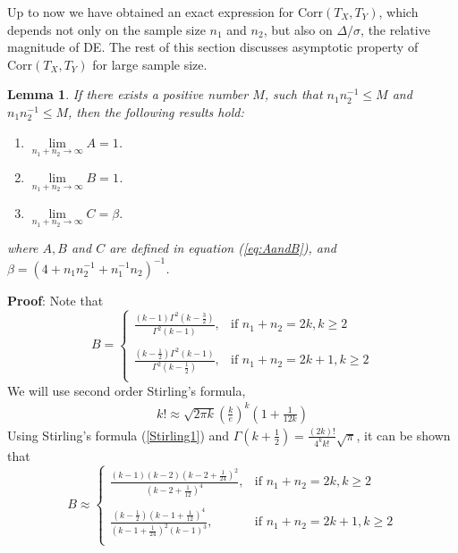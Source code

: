 \documentclass[12pt, a4paper]{article}
\newtheorem{lemma}{Lemma}
\newcommand{\cor}{\text{Corr}}
\begin{document}
	Up to now we have obtained an exact expression for $\cor(T_X, T_Y)$, which depends not only on
	the sample size $n_1$ and $n_2$, but also on $\Delta/\sigma$, the relative magnitude of DE. The rest of this section
	discusses asymptotic  property of $\cor(T_X, T_Y)$ for large sample size.
	\begin{lemma}\label{lemmaLimit}
	If there exists a positive number $M$, such that  $n_1n_2^{-1}\leq M$ and $n_1n_2^{-1}\leq M$, then the following results hold:
		\begin{enumerate}
			\item $\lim\limits_{n_1 + n_2\rightarrow \infty} A = 1$.
			\item $\lim\limits_{n_1 + n_2\rightarrow \infty} B = 1$.
			\item $\lim\limits_{n_1 + n_2\rightarrow \infty} C = \beta.$
		\end{enumerate}
	where  $A, B$ and $C$ are defined in equation (\ref{eq:AandB}), and $\beta= (4 + n_1n_2^{-1} + n_1^{-1}n_2)^{-1}$. 
	\end{lemma}
	\textbf{Proof}: Note that 
	\begin{equation}
	B = 
	\begin{cases}
	\frac{(k-1)\Gamma^2(k- \frac{3}{2})}{\Gamma^2(k-1)},& \text{if } n_1 + n_2 = 2k, k\geq 2 \\
	~\\
	 \frac{(k-\frac{1}{2})\Gamma^2(k- 1)}{\Gamma^2(k-\frac{1}{2})},& \text{if } n_1 + n_2 = 2k+1, k\geq 2 \\
	\end{cases}
	\end{equation}
	We will use second order Stirling's formula,
	\begin{align}\label{Stirling1}
		k! \approx \sqrt{2\pi k}\left(\frac{k}{e}\right)^k(1 + \frac{1}{12k})
	\end{align}
	Using Stirling's formula (\ref{Stirling1}) and  $\Gamma(k + \frac{1}{2}) =
	\frac{(2k)!}{4^kk!}\sqrt{\pi}$, it can be shown that 
	\begin{equation}\label{eq:Bapprox}
			B \approx  
		\begin{cases}
			\frac{(k-1)(k-2)(k-2 + \frac{1}{24})^2}{(k-2 + \frac{1}{12})^4},& \text{if } n_1 + n_2 = 2k, k\geq 2 \\
			  ~\\
			\frac{(k-\frac{1}{2})(k - 1 + \frac{1}{12})^4}{(k-1+ \frac{1}{24})^2(k-1)^3},& \text{if } n_1 + n_2 = 2k+1, k\geq 2 \\
		\end{cases}
	\end{equation}
\end{document}
